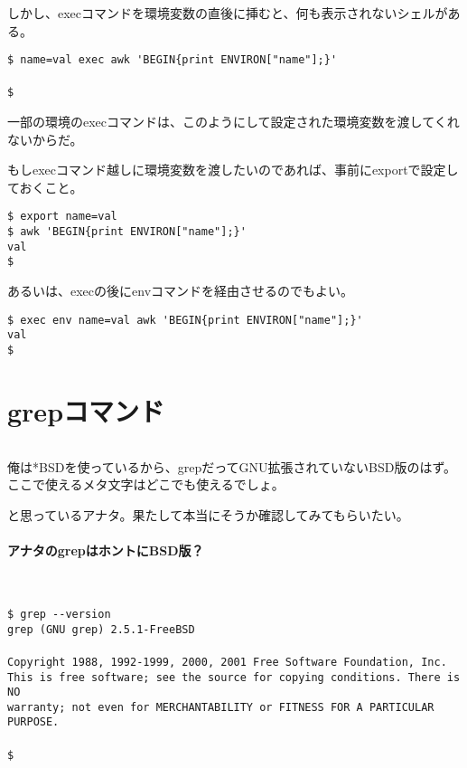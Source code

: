 しかし、execコマンドを環境変数の直後に挿むと、何も表示されないシェルがある。

\begin{screen}
	\verb|$ name=val exec awk 'BEGIN{print ENVIRON["name"];}'| \return \\
	\verb|| \\
	\verb|$ |
\end{screen}

一部の環境のexecコマンドは、このようにして設定された環境変数を渡してくれないからだ。

もしexecコマンド越しに環境変数を渡したいのであれば、事前にexportで設定しておくこと。

\begin{screen}
	\verb|$ export name=val| \return \\
	\verb|$ awk 'BEGIN{print ENVIRON["name"];}'| \return \\
	\verb|val| \\
	\verb|$ |
\end{screen}

あるいは、execの後にenvコマンドを経由させるのでもよい。

\begin{screen}
	\verb|$ exec env name=val awk 'BEGIN{print ENVIRON["name"];}'| \return \\
	\verb|val| \\
	\verb|$ |
\end{screen}

\section{grepコマンド}
\label{allenvs:grep}

\noindent
$\!\!\!\!\!$
\begin{grshfboxit}{160.0mm}
	俺は*BSDを使っているから、grepだってGNU拡張されていないBSD版のはず。ここで使えるメタ文字はどこでも使えるでしょ。
\end{grshfboxit}
と思っているアナタ。果たして本当にそうか確認してみてもらいたい。

\paragraph{アナタのgrepはホントにBSD版？} 　\\
\begin{screen}
	\verb|$ grep --version| \return \\
	\verb|grep (GNU grep) 2.5.1-FreeBSD| \return \\
	\verb|| \\
	\verb|Copyright 1988, 1992-1999, 2000, 2001 Free Software Foundation, Inc.| \\
	\verb|This is free software; see the source for copying conditions. There is NO| \\
	\verb|warranty; not even for MERCHANTABILITY or FITNESS FOR A PARTICULAR PURPOSE.| \\
	\verb|| \\
	\verb|$ |
\end{screen}

